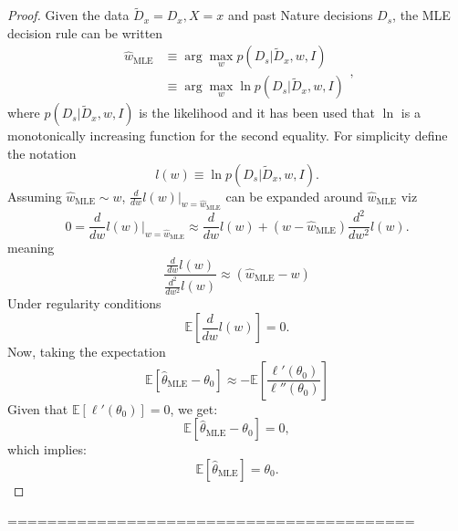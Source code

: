 
\begin{proof}
	Given the data $\tilde{D}_x = D_x,X=x$ and past Nature decisions $D_s$, the MLE decision rule can be written
	\begin{equation}
		\begin{split}
			\hat{w}_{\text{MLE}} &\equiv \arg \max_{w} p(D_s|\tilde{D}_x,w,I)\\
			&\equiv \arg \max_{w} \ln p(D_s|\tilde{D}_x,w,I)
		\end{split},
	\end{equation}
	where $p(D_s|\tilde{D}_x,w,I)$ is the likelihood and it has been used that $\ln$ is a monotonically increasing function for the second equality. For simplicity define the notation
	\begin{equation}
		l(w) \equiv \ln p(D_s|\tilde{D}_x,w,I).
	\end{equation}	
	Assuming $\hat{w}_{\text{MLE}}\sim w$, $\frac{d}{dw}l(w)|_{w=\hat{w}_{\text{MLE}}}$ can be expanded around $\hat{w}_{\text{MLE}}$ viz
	\begin{equation}
		0=\frac{d}{dw}l(w)\bigg|_{w=\hat{w}_{\text{MLE}}}\approx \frac{d}{dw}l(w)+(w-\hat{w}_{\text{MLE}})\frac{d^2}{dw^2}l(w).
	\end{equation}
	meaning
	\begin{equation}
		\frac{\frac{d}{dw}l(w)}{\frac{d^2}{dw^2}l(w)}\approx(\hat{w}_{\text{MLE}}-w)
	\end{equation}
	Under regularity conditions
	\begin{equation}
		\mathbb{E}[\frac{d}{dw}l(w)] = 0.
	\end{equation}
	Now, taking the expectation
	\begin{equation}
		\mathbb{E}[\hat{\theta}_{\text{MLE}} - \theta_0] \approx - \mathbb{E}\left[\frac{\ell'(\theta_0)}{\ell''(\theta_0)}\right]
	\end{equation}
	Given that \(\mathbb{E}[\ell'(\theta_0)] = 0\), we get:
	\begin{equation}
		\mathbb{E}[\hat{\theta}_{\text{MLE}} - \theta_0] = 0,
	\end{equation}
	which implies:
	\begin{equation}
		\mathbb{E}[\hat{\theta}_{\text{MLE}}] = \theta_0.
	\end{equation}
\end{proof}

=========================================

